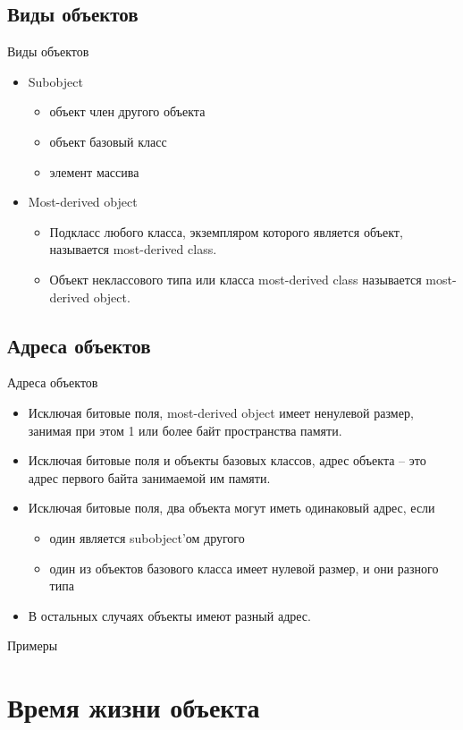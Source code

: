 \documentclass[xetex,mathserif,serif,10pt]{beamer}
\begin{document}
    \subsection{Виды объектов}
    \begin{frame}{Виды объектов}
        \begin{itemize}
            \item Subobject
                \begin{itemize}
                    \item объект член другого объекта
                    \item объект базовый класс
                    \item элемент массива
                \end{itemize}
            \item Most-derived object
                \begin{itemize}
                    \item Подкласс любого класса, экземпляром которого является объект, называется most-derived class.
                    \item Объект неклассового типа или класса most-derived class называется most-derived object.
                \end{itemize}
        \end{itemize}
    \end{frame}
    \subsection{Адреса объектов}
    \begin{frame}{Адреса объектов}
        \begin{itemize}
            \item Исключая битовые поля, most-derived object имеет ненулевой размер, занимая при этом 1 или более байт
                пространства памяти.
            \item Исключая битовые поля и объекты базовых классов, адрес объекта -- это адрес первого байта занимаемой им памяти.
            \item Исключая битовые поля, два объекта могут иметь одинаковый адрес, если
                \begin{itemize}
                    \item один является subobject'ом другого
                    \item один из объектов базового класса имеет нулевой размер, и они разного типа
                \end{itemize}
            \item В остальных случаях объекты имеют разный адрес.
        \end{itemize}
    \end{frame}
    \begin{frame}{Примеры}
        
    \end{frame}
    \section{Время жизни объекта}
    \subsection{}
    \begin{frame}{}
    \end{frame}
\end{document}
